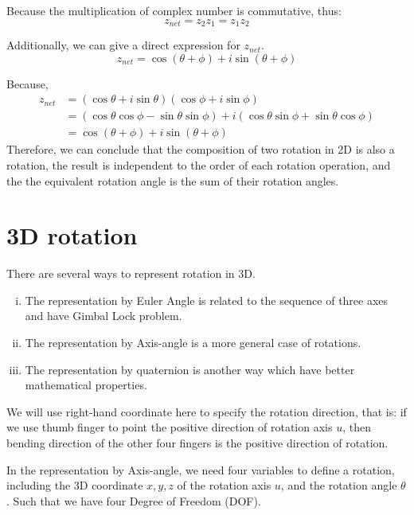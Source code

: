 \documentclass[runningheads]{llncs}
\begin{document}
Because the multiplication of complex number is commutative, thus:
\begin{equation}
  z_{net}= z_2z_1 = z_1z_2
\end{equation}

Additionally, we can give a direct expression for $z_{net}$.
\begin{equation}
  z_{net}= \cos(\theta+\phi)+i\sin(\theta+\phi)
\end{equation}

Because,
\begin{equation}
  \begin{aligned}
    z_{net}
    &= (\cos\theta+i\sin\theta)(\cos\phi+i\sin\phi)\\
    &= (\cos\theta\cos\phi-\sin\theta\sin\phi)+i(\cos\theta\sin\phi+\sin\theta\cos\phi)\\
    &= \cos(\theta+\phi) + i\sin(\theta+\phi)
  \end{aligned}
\end{equation}
Therefore, we can conclude that the composition of two rotation in 2D is also a rotation, the result is independent to the order of each rotation operation, and the the equivalent rotation angle is the sum of their rotation angles.

\section{3D rotation}

There are several ways to represent rotation in 3D.
\begin{enumerate}[i.]
\item The representation by Euler Angle is related to the sequence of three axes and have Gimbal Lock problem.
\item The representation by Axis-angle is a more general case of rotations.
\item The representation by quaternion is another way which have better mathematical properties.
\end{enumerate}

We will use right-hand coordinate here to specify the rotation direction, that is: if we use thumb finger to point the positive direction of rotation axis $u$, then bending direction of the other four fingers is the positive direction of rotation.

In the representation by Axis-angle, we need four variables to define a rotation, including the 3D coordinate $x,y,z$ of the rotation axis $u$, and the rotation angle $\theta$.
Such that we have four Degree of Freedom (DOF).
\end{document}
